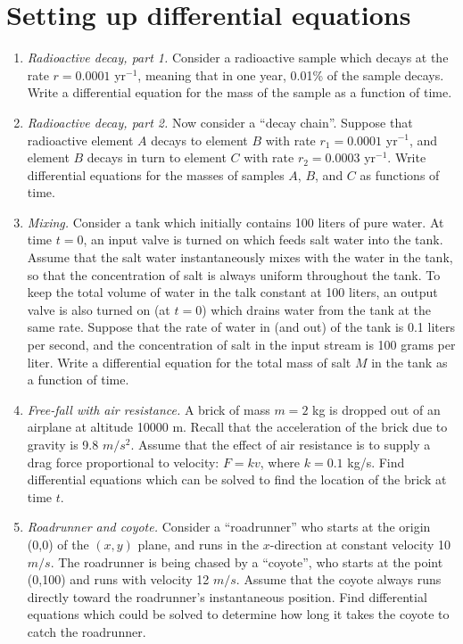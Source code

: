 \documentclass[aps,prd,superscriptaddress,groupedaddress,nofootinbib,nobibnotes]{revtex4}
\begin{document}
\section{Setting up differential equations}

\begin{enumerate}[resume]
\item {\em Radioactive decay, part 1.} Consider a radioactive sample which decays
  at the rate $r = 0.0001$ yr$^{-1}$, meaning that in one year, 0.01\% of the sample decays.
  Write a differential equation for the mass of the sample as a function of time.

\item {\em Radioactive decay, part 2.} Now consider a ``decay chain''.  Suppose that radioactive
  element $A$ decays to element $B$ with rate $r_1 = 0.0001$ yr$^{-1}$, and element $B$ decays in
  turn to element $C$ with rate $r_2 = 0.0003$ yr$^{-1}$.  Write differential equations for the
  masses of samples $A$, $B$, and $C$ as functions of time.

\item {\em Mixing.} Consider a tank which initially contains 100 liters of pure water.
  At time $t=0$, an input valve is turned on which feeds salt water into the tank.
  Assume that the salt water instantaneously mixes with the water in the tank, so that the
  concentration of salt is always uniform throughout the tank.
  To keep the total volume of water in the talk constant at 100 liters, an output valve
  is also turned on (at $t=0$) which drains water from the tank at the same rate.
  Suppose that the rate of water in (and out) of the tank is 0.1 liters per second, and
  the concentration of salt in the input stream is 100 grams per liter.
  Write a differential equation for the total mass of salt $M$ in the tank as a function of time.

\item {\em Free-fall with air resistance.} A brick of mass $m = 2$ kg is dropped out of an airplane at 
  altitude 10000 m.  Recall that the acceleration of the brick due to gravity is 9.8 $m/s^2$.  Assume
  that the effect of air resistance is to supply a drag force proportional to velocity: $F = kv$,
  where $k = 0.1$ kg/s.
  Find differential equations which can be solved to find the location of the brick at time $t$.

\item {\em Roadrunner and coyote.} Consider a ``roadrunner'' who starts at the origin (0,0) of the
  $(x,y)$ plane, and runs in the $x$-direction at constant velocity 10 $m/s$.  The roadrunner is
  being chased by a ``coyote'', who starts at the point (0,100) and runs with velocity 12 $m/s$.
  Assume that the coyote always runs directly toward the roadrunner's instantaneous position.
  Find differential equations which could be solved to determine how long it takes the coyote
  to catch the roadrunner.
\end{enumerate}
\end{document}

